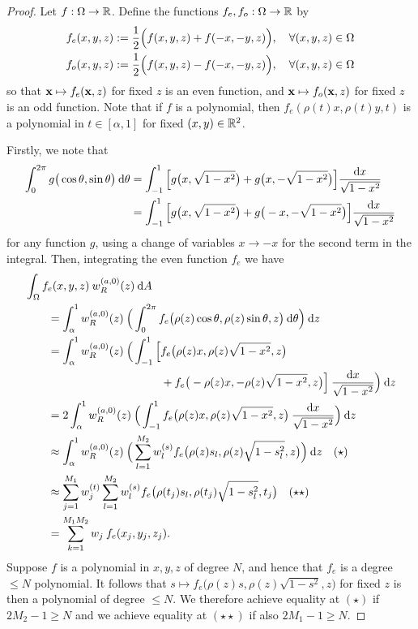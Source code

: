 \documentclass[11pt, oneside]{article}   	%
\begin{document}
\begin{proof}
Let $f : \Omega \to \mathbb{R}$. Define the functions $f_e, f_o : \Omega \to \mathbb{R}$ by 
\begin{align*}
	f_e(x,y,z) &:= \frac{1}{2} \Big(f(x, y,z) + f(-x, -y,z)\Big), \quad \forall (x,y,z) \in \Omega\\
	f_o(x,y,z) &:= \frac{1}{2} \Big(f(x, y,z) - f(-x, -y,z)\Big), \quad \forall (x,y,z) \in \Omega
\end{align*}
so that $\mathbf{x} \mapsto f_e(\mathbf{x}, z)$ for fixed $z$ is an even function, and $\mathbf{x} \mapsto f_o(\mathbf{x}, z)$ for fixed $z$ is an odd function. Note that if $f$ is a polynomial, then $f_e(\rho(t)x, \rho(t)y, t)$ is a polynomial in $t \in [\alpha,1]$ for fixed $(x,y) \in \mathbb{R}^2$. 

Firstly, we note that
\begin{align*}
	\int_0^{2\pi} g\big(\cos \theta, \sin\theta\big) \: {\rm d} \theta &= \int_{-1}^1 \Big[ g\big(x, \sqrt{1-x^2}\big) + g\big(x, -\sqrt{1-x^2}\big) \Big] \frac{{\rm d} x}{\sqrt{1-x^2}} \\
	&= \int_{-1}^1 \Big[ g\big(x, \sqrt{1-x^2}\big) + g\big(-x, -\sqrt{1-x^2}\big) \Big] \frac{{\rm d} x}{\sqrt{1-x^2}}
\end{align*}
for any function $g$, using a change of variables $x \to -x$ for the second term in the integral. Then, integrating the even function $f_e$ we have
\begin{align*}
	&\int_\Omega f_e(x,y,z) \: w_R^{(a,0)}(z) \: {\rm d} A \\
	&\quad \quad = \int_\alpha^1 w_R^{(a,0)}(z) \: \Big( \int_0^{2\pi} f_e\big(\rho(z)\cos\theta,\rho(z)\sin\theta, z\big) \: {\rm d} \theta \Big) \: {\rm d} z \\
	&\quad \quad = \int_\alpha^1 w_R^{(a,0)}(z) \: \Big( \int_{-1}^1 \Big[ f_e\big(\rho(z)x,\rho(z)\sqrt{1-x^2}, z\big) \\
	&\quad \quad \quad \quad \quad \quad \quad \quad \quad \quad \quad \quad + f_e\big(-\rho(z)x, - \rho(z)\sqrt{1-x^2}, z\big) \Big] \: \frac{{\rm d} x}{\sqrt{1-x^2}} \Big) \: {\rm d} z \\
	&\quad \quad = 2 \int_\alpha^1 w_R^{(a,0)}(z) \: \Big( \int_{-1}^1 f_e\big(\rho(z)x,\rho(z)\sqrt{1-x^2}, z\big) \: \frac{{\rm d} x}{\sqrt{1-x^2}} \Big) \: {\rm d} z \\
	&\quad \quad \approx \int_\alpha^1 w_R^{(a,0)}(z) \: \Big( \sum_{l=1}^{M_2} w_l^{(s)} f_e\big(\rho(z) s_l, \rho(z) \sqrt{1 - s_l^2}, z\big) \Big) \: {\rm d} z \quad (\star) \\
	&\quad \quad \approx \sum_{j=1}^{M_1} w_j^{(t)} \sum_{l=1}^{M_2} w_l^{(s)} f_e\big(\rho(t_j) s_l, \rho(t_j) \sqrt{1 - s_l^2}, t_j\big) \quad (\star \star) \\
	&\quad \quad = \sum_{k=1}^{M_1 M_2}  w_j \: f_e(x_j, y_j, z_j).
\end{align*}
Suppose $f$ is a polynomial in $x,y,z$ of degree $N$, and hence that $f_e$ is a degree $\le N$ polynomial. It follows that $s \mapsto f_e\big(\rho(z)s,\rho(z)\sqrt{1-s^2}, z\big)$ for fixed $z$ is then a polynomial of degree $\le N$. We therefore achieve equality at $(\star)$ if $2M_2 - 1 \ge N$ and we achieve equality at $(\star \star)$ if also $2M_1 - 1 \ge N$.


\end{proof}
\end{document}
